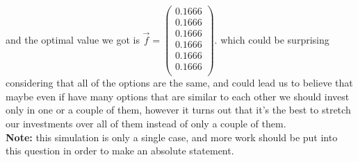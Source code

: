 \documentclass{article}
\begin{document}
	and the optimal value we got is 
	\begin{math}
		\overrightarrow{f} = 
		\begin{pmatrix}
			0.1666 \\
			0.1666 \\
			0.1666 \\
			0.1666 \\
			0.1666 \\
			0.1666 \\
		\end{pmatrix}
	\end{math}.
	\newline\newline
	which could be surprising considering that all of the options are the same, and could lead us to believe that maybe even if have many options that are similar to each other we should invest only in one or a couple of them, however it turns out that it's the best to stretch our investments over all of them instead of only a couple of them.\\
	\textbf{Note:} this simulation is only a single case, and more work should be put into this question in order to make an absolute statement.
\end{document}
